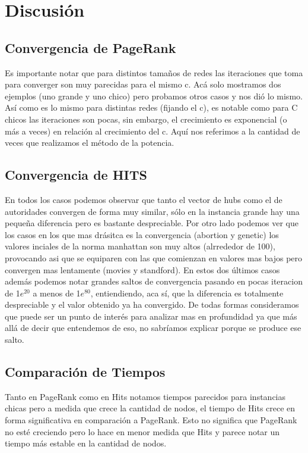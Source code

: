 \section{Discusi\'on}

\subsection{Convergencia de PageRank}
Es importante notar que para distintos tamaños de redes las iteraciones que toma para converger son muy parecidas para el mismo c. Acá solo mostramos dos ejemplos (uno grande y uno chico) pero probamos otros casos y nos dió lo mismo. \\
Así como es lo mismo para distintas redes (fijando el c), es notable como para C chicos las iteraciones son pocas, sin embargo, el crecimiento es exponencial (o más a veces) en relación al crecimiento del c. Aquí nos referimos a la cantidad de veces que realizamos el método de la potencia.

\subsection{Convergencia de HITS}
En todos los casos podemos observar que tanto el vector de hubs como el de autoridades convergen de forma muy similar, sólo en la instancia grande hay una pequeña diferencia pero es bastante despreciable. 
Por otro lado podemos ver que los casos en los que mas drásitca es la convergencia (abortion y genetic) los valores inciales de la norma manhattan son muy altos (alrrededor de 100), provocando asi que se equiparen con las que comienzan en valores mas bajos pero convergen mas lentamente (movies y standford).
En estos dos últimos casos además podemos notar grandes saltos de convergencia pasando en pocas iteracion de 1$e^{20}$ a menos de 1$e^{80}$, entiendiendo, aca sí, que la diferencia es totalmente despreciable y el valor obtenido ya ha convergido. De todas formas consideramos que puede ser un punto de interés para analizar mas en profundidad ya que más allá de decir que entendemos de eso, no sabríamos explicar porque se produce ese salto. 

\subsection{Comparación de Tiempos}
Tanto en PageRank como en Hits notamos tiempos parecidos para instancias chicas pero a medida que crece la cantidad de nodos, el tiempo de Hits crece en forma significativa en comparación a PageRank. Esto no significa que PageRank no esté creciendo pero lo hace en menor medida que Hits y parece notar un tiempo más estable en la cantidad de nodos.


